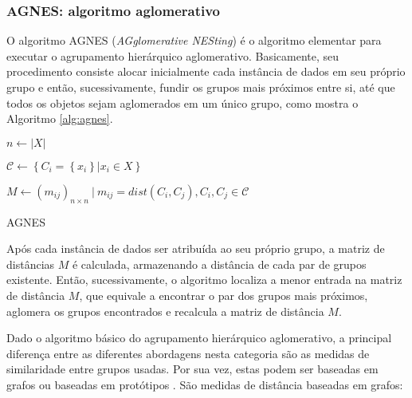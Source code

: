 \subsubsection{AGNES: algoritmo aglomerativo}
	\label{subsec:agnes}

O algoritmo AGNES (\emph{AGglomerative NESting}) é o algoritmo elementar para
executar o agrupamento hierárquico aglomerativo. Basicamente, seu procedimento
consiste alocar inicialmente cada instância de dados em seu próprio grupo e
então, sucessivamente, fundir os grupos mais próximos entre si, até que todos os
objetos sejam aglomerados em um único grupo, como mostra o Algoritmo
\ref{alg:agnes}.

\begin{algorithm}[htbp]
	
	$n \gets \left|X\right|$ \;
			
	$\mathcal{C} \gets \left\{ C_i = \left\{x_i\right\} | 
		x_i \in X \right\} $ \;
		
	$M \gets \left(m_{ij}\right)_{n \times n}\ |\ m_{ij} = 
		dist\left(C_i,C_j\right), C_i, C_j \in \mathcal{C}$ \;
	
	
	\caption{AGNES}
	\label{alg:agnes}
\end{algorithm}


Após cada instância de dados ser atribuída ao seu próprio grupo, a matriz de
distâncias $M$ é calculada, armazenando a distância de cada par de grupos
existente. Então, sucessivamente, o algoritmo localiza a menor entrada na matriz
de distância $M$, que equivale a encontrar o par dos grupos mais próximos,
aglomera os grupos encontrados e recalcula a matriz de distância $M$.

Dado o algoritmo básico do agrupamento hierárquico aglomerativo, a principal
diferença entre as diferentes abordagens nesta categoria são as medidas de 
similaridade entre grupos usadas. Por sua vez, estas podem ser baseadas em
grafos ou baseadas em protótipos \cite{tan2009introducao}. São medidas de
distância baseadas em grafos:

